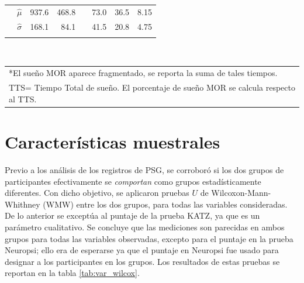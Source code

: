 \documentclass[12pt,letterpaper]{book}
\newcommand{\ppu}{\phantom{1}}
\newcommand{\bottomrulec}{%
  \arrayrulecolor{black}
  \arrayrulecolor{gris}\specialrule{\belowrulesep}{0pt}{0pt}
  \arrayrulecolor{black}\specialrule{\lightrulewidth}{0pt}{\belowrulesep}
}
\begin{document}
\begin{table}
\begin{tabular}{lllrclrr}
\rowcolor{gris}
&\multicolumn{1}{c}{$\widehat{\mu}$}  
      &\ppu 937.6 & 468.8 &&   73.0  & 36.5  & 8.15 \\
\rowcolor{gris}
&\multicolumn{1}{c}{$\widehat{\sigma}$} 
      &\ppu 168.1 &  84.1 &&   41.5  & 20.8  & 4.75 \\
\bottomrulec
\end{tabular} \\
\begin{small}
\begin{tabular}{l}
{*El sueño MOR aparece fragmentado, se reporta la suma de tales tiempos.}\\
{TTS= Tiempo Total de sueño.} {El porcentaje de sueño MOR se calcula respecto al TTS.}
\end{tabular}
\end{small}
\label{tab:psg}
\end{table}


\section{Características muestrales}

Previo a los análisis de los registros de PSG, se corroboró si los dos grupos de participantes efectivamente se \textit{comportan} como grupos estadísticamente diferentes.
%
Con dicho objetivo, se aplicaron pruebas $U$ de Wilcoxon-Mann-Whithney (WMW) entre los dos grupos, para todas las variables consideradas. 
%
De lo anterior se exceptúa al puntaje de la prueba KATZ, ya que es un parámetro cualitativo. 
%
Se concluye que las mediciones son parecidas en ambos grupos para todas las variables observadas, excepto para el puntaje en la prueba Neuropsi; ello era de esperarse ya que el puntaje en Neuropsi fue usado para designar a los participantes en los grupos.
%
Los resultados de estas pruebas se reportan en la tabla \ref{tab:var_wilcox}.
\end{document}
